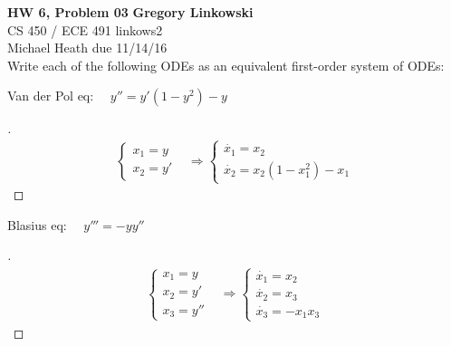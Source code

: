\documentclass[12pt]{article}
\newenvironment{exercise}[2][Exercise]{\begin{trivlist}
\item[\hskip \labelsep {\bfseries #1}\hskip \labelsep {\bfseries #2.}]}{\end{trivlist}}
\begin{document}
\noindent
\large\textbf{HW 6, Problem 03} \hfill \textbf{Gregory Linkowski} \\
\normalsize CS 450 / ECE 491 \hfill linkows2 \\
Michael Heath \hfill due 11/14/16 \\


\vspace{5mm}
Write each of the following ODEs as an equivalent first-order system of ODEs:
\vspace{-2mm} \\

\vspace{5mm}
\begin{exercise}{1}
	Van der Pol eq: $\quad y'' = y'(1-y^2) - y$
\end{exercise} \vspace{-10mm}
\begin{proof}[]
	\begin{align*}
		\begin{cases} x_1 = y \\ x_2 = y' \end{cases}
		& \Rightarrow \boxed{\begin{cases}
			\dot{x_1} = x_2 \\
			\dot{x_2} = x_2 (1 - x_1^2) - x_1
		\end{cases}}
	\end{align*}
\end{proof}

\vspace{10mm}
\begin{exercise}{2}
	Blasius eq: $\quad y'''  = -y y''$
\end{exercise} \vspace{-10mm}
\begin{proof}[]
	\begin{align*}
		\begin{cases} x_1 = y \\ x_2 = y' \\ x_3 = y'' \end{cases}
		& \Rightarrow \boxed{\begin{cases}
		\dot{x_1} = x_2 \\
		\dot{x_2} = x_3 \\
		\dot{x_3} = - x_1 x_3
		\end{cases}}
	\end{align*}
\end{proof}
\end{document}
